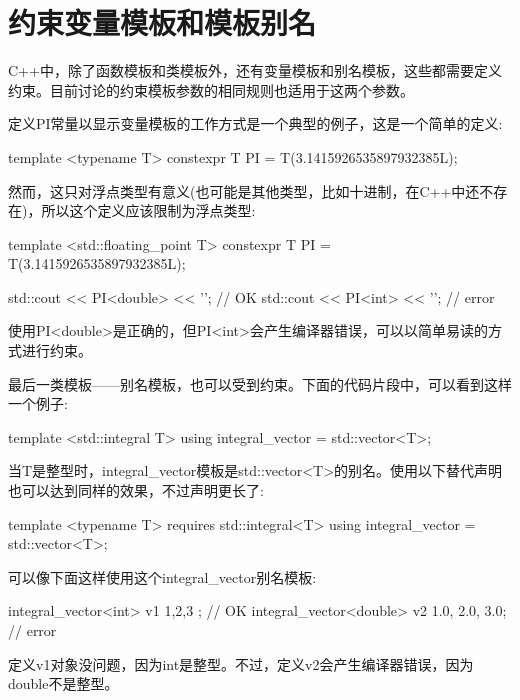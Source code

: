 \section{约束变量模板和模板别名}
C++中，除了函数模板和类模板外，还有变量模板和别名模板，这些都需要定义约束。目前讨论的约束模板参数的相同规则也适用于这两个参数。

定义PI常量以显示变量模板的工作方式是一个典型的例子，这是一个简单的定义:

\begin{cpp}
template <typename T>
constexpr T PI = T(3.1415926535897932385L);
\end{cpp}

然而，这只对浮点类型有意义(也可能是其他类型，比如十进制，在C++中还不存在)，所以这个定义应该限制为浮点类型:

\begin{cpp}
template <std::floating_point T>
constexpr T PI = T(3.1415926535897932385L);

std::cout << PI<double> << '\n'; // OK
std::cout << PI<int> << '\n'; // error
\end{cpp}

使用PI<double>是正确的，但PI<int>会产生编译器错误，可以以简单易读的方式进行约束。

最后一类模板——别名模板，也可以受到约束。下面的代码片段中，可以看到这样一个例子:

\begin{cpp}
template <std::integral T>
using integral_vector = std::vector<T>;
\end{cpp}

当T是整型时，integral\_vector模板是std::vector<T>的别名。使用以下替代声明也可以达到同样的效果，不过声明更长了:

\begin{cpp}
template <typename T>
requires std::integral<T>
using integral_vector = std::vector<T>;
\end{cpp}

可以像下面这样使用这个integral\_vector别名模板:

\begin{cpp}
integral_vector<int> v1 { 1,2,3 }; // OK
integral_vector<double> v2 {1.0, 2.0, 3.0}; // error
\end{cpp}

定义v1对象没问题，因为int是整型。不过，定义v2会产生编译器错误，因为double不是整型。

